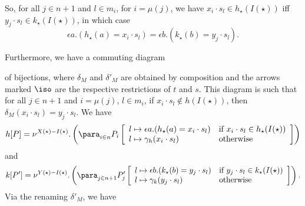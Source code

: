 \documentclass{LMCS}
\theoremstyle{plain}\newtheorem{satz}[thm]{Satz}
\begin{document}
So, for all $j \in n+1$ and $l \in m_i$, for $i = \mu(j)$, we have
$x_i \cdot s_l \in h_\star (I (\star))$ iff $y_j \cdot s_l \in k_\star
(I (\star))$, in which case
$$\epsilon a.(h_\star(a) = x_i \cdot s_l) =
\epsilon b.(k_\star(b) = y_j \cdot s_l).$$

Furthermore, we have a commuting diagram
\begin{center}
\end{center}
of bijections, where $\delta_M$ and $\delta'_M$ are obtained by
composition and the arrows marked 
$\iso$ are the respective restrictions of $t$ and $s$.
This diagram is such that for all $j \in n+1$ and $i = \mu(j)$, $l \in m_i$, if
$x_i \cdot s_l \notin h (I (\star))$, then $\delta_M(x_i \cdot s_l) =
y_j \cdot s_l$.
We have
$$h[P] =  \nu^{X (\star) - I (\star)}. \left (\para_{i \in n} P_i\left [
  \begin{array}[c]{ll}
    l \mapsto \epsilon a.(h_\star(a) = x_i \cdot s_l) & \mbox{if $x_i \cdot s_l \in h_\star (I(\star))$} \\
    l \mapsto \gamma_h(x_i \cdot s_l) & \mbox{otherwise} 
  \end{array}
\right ] \right ) $$
and
$$k[P'] =  \nu^{Y (\star) - I (\star)}. \left (\para_{j \in n+1} P'_j\left [
  \begin{array}[c]{ll}
    l \mapsto \epsilon b.(k_\star(b) = y_j \cdot s_l) & \mbox{if $y_j \cdot s_l \in k_\star (I(\star))$} \\
    l \mapsto \gamma_k(y_j \cdot s_l) & \mbox{otherwise} 
  \end{array}
\right ] \right ). 
$$
Via the renaming $\delta'_M$,
we have
\end{document}
